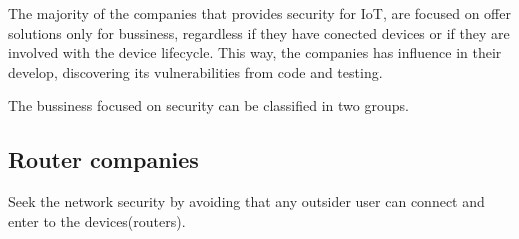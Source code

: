 

The majority of the companies that provides security for IoT, are focused on offer solutions only for bussiness, regardless if they have conected devices or if they are involved with the device lifecycle. This way, the companies has influence in their develop, discovering its vulnerabilities from code and testing.

The bussiness focused on \IoT security can be classified in two groups. 

\subsection{Router companies}

Seek the network security by avoiding that any outsider user can connect and enter to the devices(routers).

